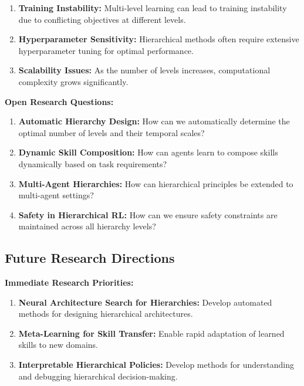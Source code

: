 \documentclass[12pt]{article}
\begin{document}
{{\begin{enumerate}
    \item \textbf{Training Instability:} Multi-level learning can lead to training instability due to conflicting objectives at different levels.
    
    \item \textbf{Hyperparameter Sensitivity:} Hierarchical methods often require extensive hyperparameter tuning for optimal performance.
    
    \item \textbf{Scalability Issues:} As the number of levels increases, computational complexity grows significantly.
\end{enumerate}

\textbf{Open Research Questions:}
\begin{enumerate}
    \item \textbf{Automatic Hierarchy Design:} How can we automatically determine the optimal number of levels and their temporal scales?
    
    \item \textbf{Dynamic Skill Composition:} How can agents learn to compose skills dynamically based on task requirements?
    
    \item \textbf{Multi-Agent Hierarchies:} How can hierarchical principles be extended to multi-agent settings?
    
    \item \textbf{Safety in Hierarchical RL:} How can we ensure safety constraints are maintained across all hierarchy levels?
\end{enumerate}

\subsection{Future Research Directions}

\textbf{Immediate Research Priorities:}
\begin{enumerate}
    \item \textbf{Neural Architecture Search for Hierarchies:} Develop automated methods for designing hierarchical architectures.
    
    \item \textbf{Meta-Learning for Skill Transfer:} Enable rapid adaptation of learned skills to new domains.
    
    \item \textbf{Interpretable Hierarchical Policies:} Develop methods for understanding and debugging hierarchical decision-making.
    

\end{enumerate}}}
\end{document}
